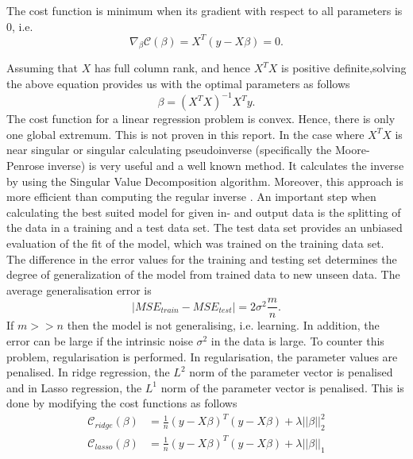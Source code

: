 The cost function is minimum when its gradient with respect to all parameters is 0, i.e.
\begin{equation*}
    \nabla_{\beta}\mathcal{C}(\beta) = X^T(y-X\beta) = 0.
\end{equation*}

Assuming that $X$ has full column rank, and hence $X^T X$ is positive definite,solving the above equation provides us with the optimal parameters as follows
\begin{equation}
    \beta = (X^TX)^{-1}X^Ty.
\end{equation}
The cost function for a linear regression problem is convex. Hence, there is only one global extremum. This is not proven in this report.
\newline \newline
In the case where $X^T X$ is near singular or singular calculating pseudoinverse (specifically the
Moore-Penrose inverse) is very useful and a well known method. It calculates the inverse by using the Singular Value Decomposition algorithm. Moreover, this approach is more efficient than computing the regular inverse \cite{geron_hands-machine_2019}.
\newline \newline
An important step when calculating the best suited model for given in- and output data is the splitting of the data in a training and a test data set. The test data set provides an unbiased evaluation of the fit of the model, which was trained on the training data set. \newline
The difference in the error values  for the training and testing set determines the degree of generalization of the model from trained data to new unseen data. The average generalisation error is \cite{mehta_high-bias_2019}
\begin{equation*}
    |MSE_{train} - MSE_{test}| = 2\sigma^2\frac{m}{n}.
\end{equation*}
If $m >> n$ then the model is not generalising, i.e. learning. In addition, the error can be large if the intrinsic noise $\sigma^2$ in the data is large. To counter this problem, regularisation is performed. In regularisation, the parameter values are penalised. In ridge regression, the $L^2$ norm of the parameter vector is penalised and in Lasso regression, the $L^1$ norm of the parameter vector is penalised. This is done by modifying the cost functions as follows
\begin{align}
    \mathcal{C}_{ridge}(\beta) &=  \frac{1}{n}( y -  {X\beta})^T( y -  {X\beta}) + \lambda||\beta||_2^2 \\
    \mathcal{C}_{lasso}(\beta) &=  \frac{1}{n}( y -  {X\beta})^T( y -  {X\beta}) + \lambda||\beta||_1
\end{align}


